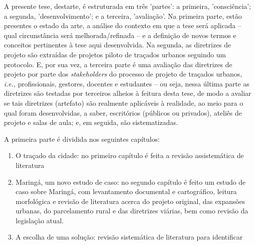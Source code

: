 \documentclass[12pt, a4paper]{book} %
\begin{document}
            A presente tese, destarte, é estruturada em três 'partes': a primeira, 'consciência'; a segunda, 'desenvolvimento'; e a terceira, 'avaliação'. Na primeira parte, estão presentes o estado da arte, a análise do contexto em que a tese será aplicada – qual circunstância será melhorada/refinada – e a definição de novos termos e conceitos pertinentes à tese aqui desenvolvida. Na segunda, as diretrizes de projeto são extraídas de projetos piloto de traçados urbanos seguindo um protocolo. E, por sua vez, a terceira parte é uma avaliação das diretrizes de projeto por parte dos \textit{stakeholders} do processo de projeto de traçados urbanos, \textit{i.e.,} profissionais, gestores, docentes e estudantes – ou seja, nessa última parte as diretrizes são testadas por terceiros alheios à feitura desta tese, de modo a avaliar se tais diretrizes (artefato) são realmente aplicáveis à realidade, ao meio para o qual foram desenvolvidas, a saber, escritórios (públicos ou privados), ateliês de projeto e salas de aula; e, em seguida, são sistematizadas.

            A primeira parte é dividida nos seguintes capítulos:
            \begin{enumerate}
                \item O traçado da cidade: no primeiro capítulo é feita a revisão assistemática de literatura
                
                \item Maringá, um novo estudo de caso: no segundo capítulo é feito um estudo de caso sobre Maringá, com levantamento documental e cartográfico, leitura morfológica e revisão de literatura acerca do projeto original, das expansões urbanas, do parcelamento rural e das diretrizes viárias, bem como revisão da legislação atual.
                
                \item A escolha de uma solução: revisão sistemática de literatura para identificar 
            \end{enumerate}
\end{document}
